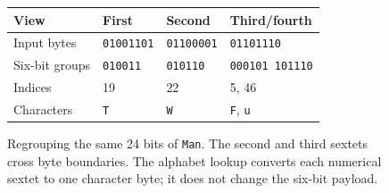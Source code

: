 \begin{figure}[htbp]
  \centering
  \begin{tabular}{l l l l}
    \toprule
    View           & First             & Second            & Third/fourth           \\
    \midrule
    Input bytes    & \texttt{01001101} & \texttt{01100001} & \texttt{01101110}      \\
    Six-bit groups & \texttt{010011}   & \texttt{010110}   & \texttt{000101 101110} \\
    Indices        & 19                & 22                & 5, 46                  \\
    Characters     & \texttt{T}        & \texttt{W}        & \texttt{F}, \texttt{u} \\
    \bottomrule
  \end{tabular}
  \caption{Regrouping the same 24 bits of \texttt{Man}. The second and third sextets cross byte boundaries. The alphabet lookup converts each numerical sextet to one character byte; it does not change the six-bit payload.}
  \label{fig:revision-base64-groups}
\end{figure}
